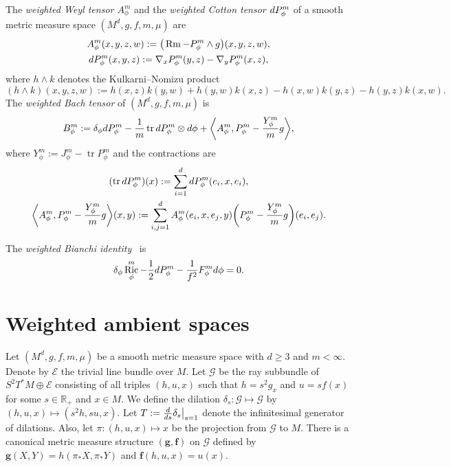 \documentclass[11pt]{article}
\numberwithin{equation}{section}
\DeclareMathOperator{\tr}{tr}
\DeclareMathOperator{\Ric}{Ric}
\DeclareMathOperator{\Rm}{Rm}
\newcommand{\lp}{\langle}
\newcommand{\rp}{\rangle}
\newcommand{\mG}{\mathcal{G}}
\newcommand{\bR}{\mathbb{R}}
\newcommand{\del}{\delta_{\phi}}
\newcommand{\ric}{\Ric_{\phi}^m}
\numberwithin{equation}{section}
\begin{document}
The \emph{weighted Weyl tensor $A_\phi^m$} and the \emph{weighted Cotton tensor ${\rm d}P_\phi^m$} of a smooth metric measure space $(M^d,g,f,m,\mu)$ are
\begin{gather*}
 A_\phi^m(x,y,z,w) := \big(\Rm - P_\phi^m \wedge g\big)(x,y,z,w) ,
 \\
 {\rm d}P_\phi^m(x,y,z) := \nabla_x P_\phi^m(y,z) - \nabla_y P_\phi^m(x,z) ,
\end{gather*}
where $h\wedge k$ denotes the Kulkarni--Nomizu product
\[
(h\wedge k)(x,y,z,w) := h(x,z)k(y,w) + h(y,w)k(x,z) - h(x,w)k(y,z) - h(y,z)k(x,w) .
\]
The \emph{weighted Bach tensor} of $(M^d,g,f,m,\mu)$ is
\[
B_\phi^m := \delta_\phi {\rm d}P_\phi^m - \frac{1}{m}\tr {\rm d}P_\phi^m \otimes {\rm d}\phi + \biggl\lp A_\phi^m, P_\phi^m - \frac{Y_\phi^m}{m}g\biggr\rp ,
\]
where $Y_\phi^m := J_\phi^m - \tr P_\phi^m$ and the contractions are
\begin{gather*}
 (\tr {\rm d}P_\phi^m)(x) := \sum_{i=1}^d {\rm d}P_\phi^m(e_i,x,e_i),
 \\
 \biggl\lp A_\phi^m, P_\phi^m - \frac{Y_\phi^m}{m}g\biggr\rp(x,y) := \sum_{i,j=1}^d A_\phi^m(e_i,x,e_j,y)\biggl(P_\phi^m - \frac{Y_\phi^m}{m}g\biggr)(e_i,e_j).
\end{gather*}

The \emph{weighted Bianchi identity}~\cite{Case2014sd} is
\begin{equation}
\label{intro-weighted-bianchi}
 \del \ric-\frac{1}{2}{\rm d}P_\phi^m-\frac{1}{f^2} F_\phi^m {\rm d}\phi=0.
\end{equation}


\section{Weighted ambient spaces}
\label{sec:fg}

Let $(M^d,g,f,m,\mu)$ be a smooth metric measure space with $d\geq 3$ and $m<\infty$. Denote by $\mathcal{E}$ the trivial line bundle over $M$. Let $\mathcal{G}$ be the ray subbundle of $S^2 T^*M\oplus \mathcal{E}$ consisting of all triples $(h,u,x)$ such that $h=s^2 g_x$ and $u=sf(x)$ for some $s\in \bR_+$ and $x\in M$. We define the dilation $\delta_s\colon \mG \mapsto \mG$ by $(h,u,x)\mapsto (s^2 h,su,x)$. Let $T:=\frac{{\rm d}}{{\rm d}s}\delta_s\big|_{s=1}$ denote the infinitesimal generator of dilations. Also, let $\pi \colon (h,u,x) \mapsto x$ be the projection from $\mG$ to $M$. There is a canonical metric measure structure $(\boldsymbol{g},\boldsymbol{f})$ on $\mG$ defined by $\boldsymbol{g}(X,Y)=h(\pi_*X,\pi_*Y)$ and $\boldsymbol{f}(h,u,x)=u(x)$.
\end{document}
